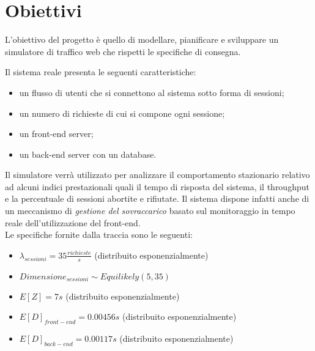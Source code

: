 \chapter{Obiettivi}
 	\label{cap:obiettivi}
 L'obiettivo del progetto è quello di modellare, pianificare e sviluppare un simulatore di traffico web che rispetti le specifiche di consegna.
 
\vspace{0.5 cm} \noindent Il sistema reale presenta le seguenti caratteristiche:
 \begin{itemize}
 \item un flusso di utenti che si connettono al sistema sotto forma di sessioni;
 \item un numero di richieste di cui si compone ogni sessione;
 \item un front-end server;
 \item un back-end server con un database.
 \end{itemize}

 Il simulatore verrà utilizzato per analizzare il comportamento stazionario relativo ad alcuni indici prestazionali quali il tempo di risposta del sistema, il throughput e la percentuale di sessioni abortite e rifiutate.
 Il sistema dispone infatti anche di un meccanismo di \emph{gestione del sovraccarico} basato sul monitoraggio in tempo reale dell'utilizzazione del front-end.\\

 Le specifiche fornite dalla traccia sono le seguenti:
 \begin{itemize}
 	\item $\lambda_{sessioni} = 35 \frac{richieste}{s}$ (distribuito esponenzialmente)
 	\item $Dimensione_{sessioni} \sim Equilikely(5, 35)$
 	\item $E[Z] = 7 s$ (distribuito esponenzialmente)
 	\item $E[D]_{front-end} = 0.00456 s$ (distribuito esponenzialmente)
 	\item $E[D]_{back-end} = 0.00117 s$ (distribuito esponenzialmente)
 \end{itemize} 

